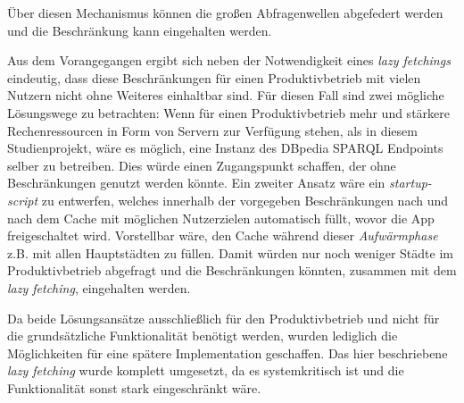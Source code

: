 		Über diesen Mechanismus können die großen Abfragenwellen abgefedert werden und die Beschränkung kann eingehalten werden.
		
		\vspace{0.25cm}
		
		Aus dem Vorangegangen ergibt sich neben der Notwendigkeit eines \textit{lazy fetchings} eindeutig, dass diese Beschränkungen für einen Produktivbetrieb mit vielen Nutzern nicht ohne Weiteres einhaltbar sind. Für diesen Fall sind zwei mögliche Lösungswege zu betrachten: Wenn für einen Produktivbetrieb mehr und stärkere Rechenressourcen in Form von Servern zur Verfügung stehen, als in diesem Studienprojekt, wäre es möglich, eine Instanz des DBpedia SPARQL Endpoints selber zu betreiben. Dies würde einen Zugangspunkt schaffen, der ohne Beschränkungen genutzt werden könnte. Ein zweiter Ansatz wäre ein \textit{startup-script} zu entwerfen, welches innerhalb der vorgegeben Beschränkungen nach und nach dem Cache mit möglichen Nutzerzielen automatisch füllt, wovor die App freigeschaltet wird. Vorstellbar wäre, den Cache während dieser \textit{Aufwärmphase} z.B. mit allen Hauptstädten zu füllen. Damit würden nur noch weniger Städte im Produktivbetrieb abgefragt und die Beschränkungen könnten, zusammen mit dem \textit{lazy fetching}, eingehalten werden.
		
		\vspace{0.25cm}
		
		Da beide Lösungsansätze ausschließlich für den Produktivbetrieb und nicht für die grundsätzliche Funktionalität benötigt werden, wurden lediglich die Möglichkeiten für eine spätere Implementation geschaffen. Das hier beschriebene \textit{lazy fetching} wurde komplett umgesetzt, da es systemkritisch ist und die Funktionalität sonst stark eingeschränkt wäre.      
